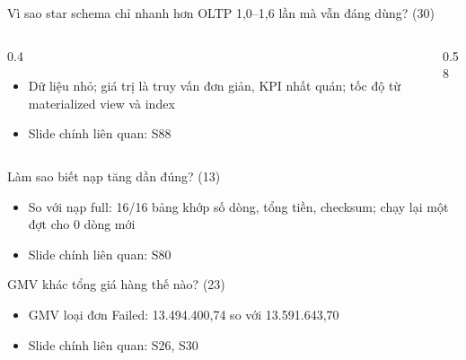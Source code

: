 \begin{frame}{Vì sao star schema chỉ nhanh hơn OLTP 1,0–1,6 lần mà vẫn đáng dùng? (30)}
\begin{columns}[T]\begin{column}{0.4\textwidth}
\begin{itemize}
  \item Dữ liệu nhỏ; giá trị là truy vấn đơn giản, KPI nhất quán; tốc độ từ materialized view và index
  \item Slide chính liên quan: S88
\end{itemize}
\end{column}\begin{column}{0.58\textwidth}
\begin{center}\end{center}
\end{column}\end{columns}

\end{frame}

\begin{frame}{Làm sao biết nạp tăng dần đúng? (13)}
\begin{itemize}
  \item So với nạp full: 16/16 bảng khớp số dòng, tổng tiền, checksum; chạy lại một đợt cho 0 dòng mới
  \item Slide chính liên quan: S80
\end{itemize}


\end{frame}

\begin{frame}{GMV khác tổng giá hàng thế nào? (23)}
\begin{itemize}
  \item GMV loại đơn Failed: 13.494.400,74 so với 13.591.643,70
  \item Slide chính liên quan: S26, S30
\end{itemize}


\end{frame}

